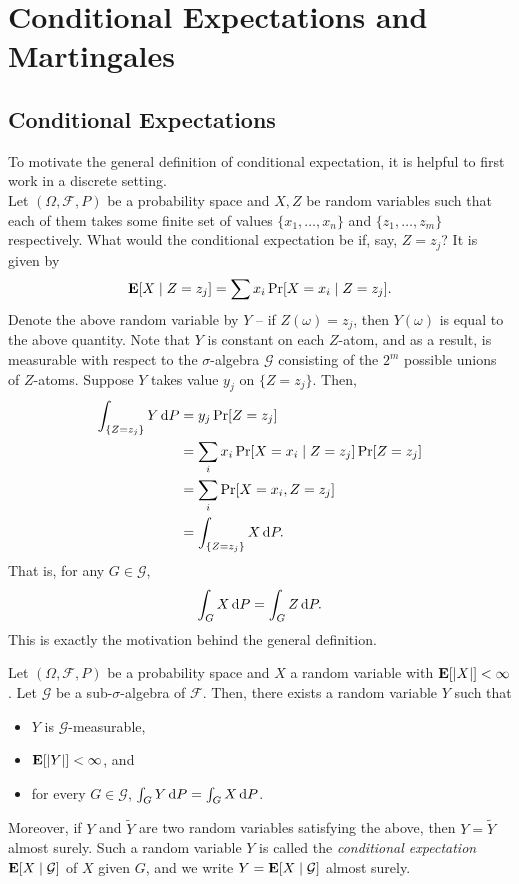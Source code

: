 \section{Conditional Expectations and Martingales}

\subsection{Conditional Expectations}

To motivate the general definition of conditional expectation, it is helpful to first work in a discrete setting.\\

Let $(\Omega,\mathcal{F},P)$ be a probability space and $X,Z$ be random variables such that each of them takes some finite set of values $\{x_1,\ldots,x_n\}$ and $\{z_1,\ldots,z_m\}$ respectively. What would the conditional expectation be if, say, $Z=z_j$? It is given by
\[ \textbf{E}[X\mid Z=z_j] = \sum x_i \Pr[X=x_i \mid Z=z_j]. \]
Denote the above random variable by $Y$ -- if $Z(\omega)=z_j$, then $Y(\omega)$ is equal to the above quantity. Note that $Y$ is constant on each $Z$-atom, and as a result, is measurable with respect to the $\sigma$-algebra $\mathcal{G}$ consisting of the $2^m$ possible unions of $Z$-atoms. Suppose $Y$ takes value $y_j$ on $\{Z=z_j\}$. Then,
\begin{align*}
	\int_{\{Z=z_j\}} Y\operatorname{d}\!{P} &= y_j \Pr[Z=z_j] \\
		&= \sum_i x_i \Pr[X=x_i\mid Z=z_j]\Pr[Z=z_j] \\
		&= \sum_i \Pr[X=x_i, Z=z_j] \\
		&= \int_{\{Z=z_j\}} X\operatorname{d}\!{P}.
\end{align*}
That is, for any $G\in\mathcal{G}$,
\[ \int_G X\operatorname{d}\!{P} = \int_G Z\operatorname{d}\!{P}. \]
This is exactly the motivation behind the general definition.

\begin{fdef}
	Let $(\Omega,\mathcal{F},P)$ be a probability space and $X$ a random variable with $\textbf{E}[|X|]<\infty$. Let $\mathcal{G}$ be a sub-$\sigma$-algebra of $\mathcal{F}$. Then, there exists a random variable $Y$ such that
	\begin{itemize}
		\item $Y$ is $\mathcal{G}$-measurable,
		\item $\textbf{E}[|Y|]<\infty$, and
		\item for every $G\in\mathcal{G}$, $\int_G Y\operatorname{d}\!{P} = \int_G X\operatorname{d}\!{P}$.
	\end{itemize}
	Moreover, if $Y$ and $\tilde{Y}$ are two random variables satisfying the above, then $Y=\tilde{Y}$ almost surely. Such a random variable $Y$ is called the \textit{conditional expectation} $\textbf{E}[X\mid\mathcal{G}]$ of $X$ given $G$, and we write $Y=\textbf{E}[X\mid\mathcal{G}]$ almost surely.
\end{fdef}

